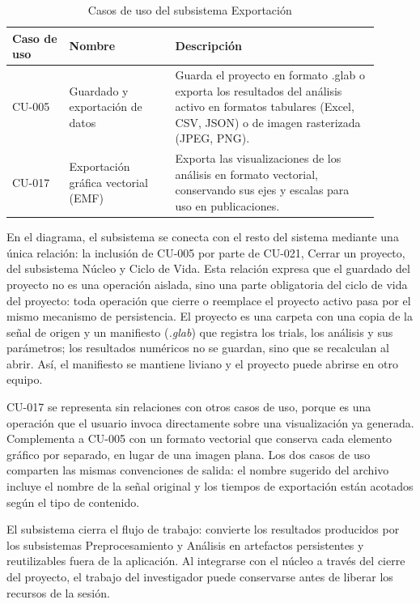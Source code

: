 \documentclass[11pt,a4paper]{article}
\DeclareRobustCommand{\_}{\textunderscore\allowbreak}
\begin{document}
\begin{table}[H]
    \centering
    \caption{Casos de uso del subsistema Exportaci\'on}
    \label{tab:cu_exportacion}
    \begin{tabular}{|p{0.14\linewidth}|p{0.26\linewidth}|p{0.50\linewidth}|}
        \hline
        \textbf{Caso de uso} & \textbf{Nombre} & \textbf{Descripci\'on} \\
        \hline
        CU-005 & Guardado y exportaci\'on de datos & Guarda el proyecto en formato .glab o exporta los resultados del an\'alisis activo en formatos tabulares (Excel, CSV, JSON) o de imagen rasterizada (JPEG, PNG). \\
        \hline
        CU-017 & Exportaci\'on gr\'afica vectorial (EMF) & Exporta las visualizaciones de los an\'alisis en formato vectorial, conservando sus ejes y escalas para uso en publicaciones. \\
        \hline
    \end{tabular}
\end{table}

En el diagrama, el subsistema se conecta con el resto del sistema mediante una \'unica relaci\'on: la inclusi\'on de CU-005 por parte de CU-021, Cerrar un proyecto, del subsistema N\'ucleo y Ciclo de Vida. Esta relaci\'on expresa que el guardado del proyecto no es una operaci\'on aislada, sino una parte obligatoria del ciclo de vida del proyecto: toda operaci\'on que cierre o reemplace el proyecto activo pasa por el mismo mecanismo de persistencia. El proyecto es una carpeta con una copia de la se\~nal de origen y un manifiesto (\textit{.glab}) que registra los trials, los an\'alisis y sus par\'ametros; los resultados num\'ericos no se guardan, sino que se recalculan al abrir. As\'i, el manifiesto se mantiene liviano y el proyecto puede abrirse en otro equipo.

CU-017 se representa sin relaciones con otros casos de uso, porque es una operaci\'on que el usuario invoca directamente sobre una visualizaci\'on ya generada. Complementa a CU-005 con un formato vectorial que conserva cada elemento gr\'afico por separado, en lugar de una imagen plana. Los dos casos de uso comparten las mismas convenciones de salida: el nombre sugerido del archivo incluye el nombre de la se\~nal original y los tiempos de exportaci\'on est\'an acotados seg\'un el tipo de contenido.

El subsistema cierra el flujo de trabajo: convierte los resultados producidos por los subsistemas Preprocesamiento y An\'alisis en artefactos persistentes y reutilizables fuera de la aplicaci\'on. Al integrarse con el n\'ucleo a trav\'es del cierre del proyecto, el trabajo del investigador puede conservarse antes de liberar los recursos de la sesi\'on.
\end{document}
